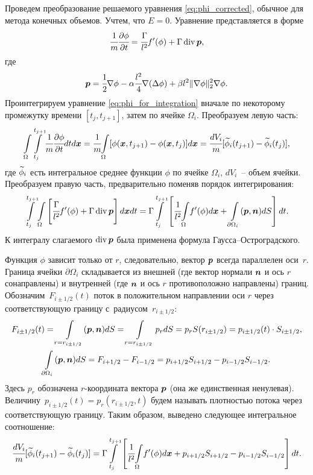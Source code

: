 Проведем преобразование решаемого уравнения \eqref{eq:phi_corrected}, обычное для метода конечных объемов. Учтем, что $E = 0$. Уравнение представляется в форме
\begin{equation}
    \cfrac{1}{m} \cfrac{\partial \phi}{\partial t} = \cfrac{\Gamma}{l^2} f'(\phi) + \Gamma \operatorname{{div}} \boldsymbol{p},
    \label{eq:phi_for_integration}
\end{equation}
где
\begin{equation}
    \boldsymbol{p} = \cfrac{1}{2} \nabla \phi - \alpha \cfrac{l^2}{4} \nabla (\Delta \phi) + \beta l^2 \| \nabla \phi \|_2^2 \nabla \phi.
    \label{eq:flow_density}
\end{equation}
Проинтегрируем уравнение \eqref{eq:phi_for_integration} вначале по некоторому промежутку времени $[t_j, t_{j + 1}]$, затем по ячейке $\Omega_i$. Преобразуем левую часть:
\[
    {\int\limits_\Omega} {\int\limits_{t_j}^{t_{j + 1}}} \cfrac{1}{m} \cfrac{\partial \phi}{\partial t} dt d {\boldsymbol{x}} = \cfrac{1}{m} {\int\limits_\Omega} [\phi({\boldsymbol{x}}, t_{j + 1}) - \phi({\boldsymbol{x}}, t_j)] d {\boldsymbol{x}} = \cfrac{dV_i}{m} [{\widetilde{\phi}}_i(t_{j + 1}) - {\widetilde{\phi}}_i(t_j)],
\]
где ${\widetilde{\phi}}_i$ есть интегральное среднее функции $\phi$ по ячейке $\Omega_i$, $dV_i$~-- объем ячейки. Преобразуем правую часть, предварительно поменяв порядок интегрирования:
\[
    {\int\limits_{t_j}^{t_{j + 1}}} {\int\limits_\Omega} \left[ \cfrac{\Gamma}{l^2} f'(\phi) + \Gamma \operatorname{{div}} \boldsymbol{p} \right] d {\boldsymbol{x}} dt = \Gamma {\int\limits_{t_j}^{t_{j + 1}}} \left[ \cfrac{1}{l^2} {\int\limits_\Omega} f'(\phi) d {\boldsymbol{x}} + \int\limits_{\partial \Omega_i} (\boldsymbol{p}, {\boldsymbol{n}}) dS \right] dt.
\]
К интегралу слагаемого $\operatorname{{div}} \boldsymbol{p}$ была применена формула Гаусса--Остроградского.

Функция $\phi$ зависит только от $r$, следовательно, вектор $\boldsymbol{p}$ всегда параллелен оси~$r$. Граница ячейки $\partial \Omega_i$ складывается из внешней (где вектор нормали ${\boldsymbol{n}}$ и ось $r$ сонаправлены) и внутренней (где ${\boldsymbol{n}}$ и ось $r$ противоположно направлены) границ. Обозначим~$F_{i \pm 1/2}(t)$ поток в положительном направлении оси $r$ через соответствующую границу с~радиусом~$r_{i \pm 1/2}$:
\begin{gather*}
    F_{i \pm 1/2}(t) = \int\limits_{r = r_{i \pm 1/2}} (\boldsymbol{p}, {\boldsymbol{n}}) dS = \int\limits_{r = r_{i \pm 1/2}} p_r dS = p_r S(r_{i \pm 1/2}) = p_{i \pm 1/2}(t) \cdot S_{i \pm 1/2}, \\
    \int\limits_{\partial \Omega_i} (\boldsymbol{p}, {\boldsymbol{n}}) dS = F_{i + 1/2} - F_{i - 1/2} = p_{i + 1/2} S_{i + 1/2} - p_{i - 1/2} S_{i - 1/2}.
\end{gather*}
Здесь $p_r$ обозначена $r$-координата вектора $\boldsymbol{p}$ (она же единственная ненулевая). Величину~$p_{i \pm 1/2}(t) = p_r(r_{i \pm 1/2}, t)$ будем называть плотностью потока через соответствующую границу. Таким образом, выведено следующее интегральное соотношение:
\begin{equation}
    \cfrac{dV_i}{m} [{\widetilde{\phi}}_i(t_{j + 1}) - {\widetilde{\phi}}_i(t_j)] = \Gamma {\int\limits_{t_j}^{t_{j + 1}}} \left[ \cfrac{1}{l^2} {\int\limits_\Omega} f'(\phi) d {\boldsymbol{x}} + p_{i + 1/2} S_{i + 1/2} - p_{i - 1/2} S_{i - 1/2} \right] dt.
    \label{eq:finite_volume_integral}
\end{equation}


